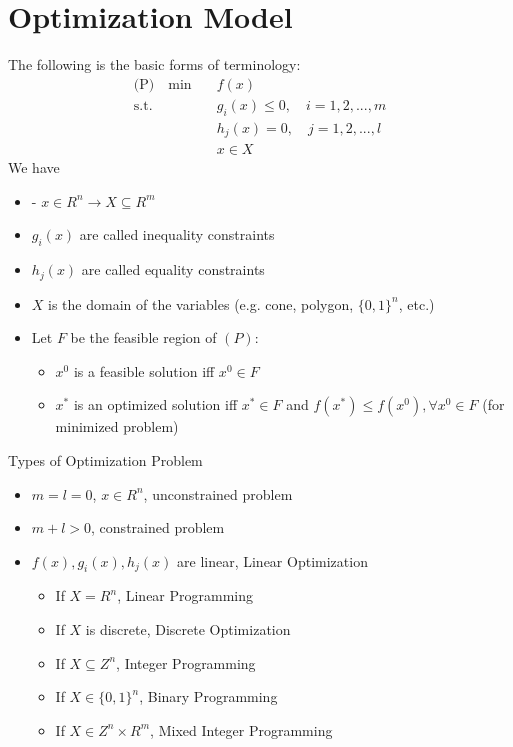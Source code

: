 			\section{Optimization Model}
				The following is the basic forms of terminology:
				\begin{align}
					\text{(P)} \quad \min \quad & f(x)  \\
								\text{s.t.} \quad & g_i(x)\le 0, \quad i=1,2,...,m \\
											& h_j(x)=0, \quad j=1,2,...,l \\
											& x \in X 
				\end{align}
				We have
				\begin{itemize}
					\item - $x\in R^n \rightarrow X \subseteq R^m$
					\item $g_i(x)$ are called inequality constraints
					\item $h_j(x)$ are called equality constraints
					\item $X$ is the domain of the variables (e.g. cone, polygon, $\{0, 1\}^n$, etc.)
					\item Let $F$ be the feasible region of $(P)$:
					\begin{itemize}
						\item $x^0$ is a feasible solution iff $x^0\in F$
						\item $x^*$ is an optimized solution iff $x^* \in F$ and $f(x^*)\le f(x^0), \forall x^0 \in F$ (for minimized problem)
					\end{itemize}
				\end{itemize}


				Types of Optimization Problem
				\begin{itemize}
					\item $m = l = 0$, $x \in R^n$, unconstrained problem
					\item $m + l > 0$, constrained problem
					\item $f(x), g_i(x), h_j(x)$ are linear, Linear Optimization
					\begin{itemize}
						\item If $X=R^n$, Linear Programming
						\item If $X$ is discrete,  Discrete Optimization
						\item If $X \subseteq Z^n$, Integer Programming
						\item If $X\in \{0,1\}^n$, Binary Programming
						\item If $X\in Z^n \times R^m$, Mixed Integer Programming
					\end{itemize}
				\end{itemize}


